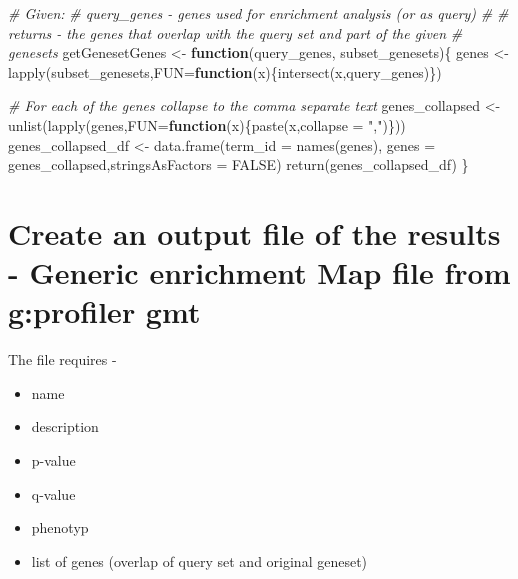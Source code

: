 \documentclass[
]{book}
\newenvironment{Shaded}{\begin{snugshade}}{\end{snugshade}}
\newcommand{\AttributeTok}[1]{\textcolor[rgb]{0.77,0.63,0.00}{#1}}
\newcommand{\CommentTok}[1]{\textcolor[rgb]{0.56,0.35,0.01}{\textit{#1}}}
\newcommand{\ConstantTok}[1]{\textcolor[rgb]{0.00,0.00,0.00}{#1}}
\newcommand{\ControlFlowTok}[1]{\textcolor[rgb]{0.13,0.29,0.53}{\textbf{#1}}}
\newcommand{\FunctionTok}[1]{\textcolor[rgb]{0.00,0.00,0.00}{#1}}
\newcommand{\NormalTok}[1]{#1}
\newcommand{\OtherTok}[1]{\textcolor[rgb]{0.56,0.35,0.01}{#1}}
\newcommand{\StringTok}[1]{\textcolor[rgb]{0.31,0.60,0.02}{#1}}
\providecommand{\tightlist}{%
  \setlength{\itemsep}{0pt}\setlength{\parskip}{0pt}}
\begin{document}
\begin{Shaded}
\begin{Highlighting}[]
\CommentTok{\# Given:}
\CommentTok{\# query\_genes {-} genes used for enrichment analysis (or as query)}
\CommentTok{\#}
\CommentTok{\# returns {-} the genes that overlap with the query set and part of the given}
\CommentTok{\#           genesets}
\NormalTok{getGenesetGenes }\OtherTok{\textless{}{-}} \ControlFlowTok{function}\NormalTok{(query\_genes, subset\_genesets)\{}
\NormalTok{  genes }\OtherTok{\textless{}{-}} \FunctionTok{lapply}\NormalTok{(subset\_genesets,}\AttributeTok{FUN=}\ControlFlowTok{function}\NormalTok{(x)\{}\FunctionTok{intersect}\NormalTok{(x,query\_genes)\})}
  
  \CommentTok{\# For each of the genes collapse to the comma separate text}
\NormalTok{  genes\_collapsed }\OtherTok{\textless{}{-}} \FunctionTok{unlist}\NormalTok{(}\FunctionTok{lapply}\NormalTok{(genes,}\AttributeTok{FUN=}\ControlFlowTok{function}\NormalTok{(x)\{}\FunctionTok{paste}\NormalTok{(x,}\AttributeTok{collapse =} \StringTok{","}\NormalTok{)\}))}
\NormalTok{  genes\_collapsed\_df }\OtherTok{\textless{}{-}} \FunctionTok{data.frame}\NormalTok{(}\AttributeTok{term\_id =} \FunctionTok{names}\NormalTok{(genes), }\AttributeTok{genes =}\NormalTok{ genes\_collapsed,}\AttributeTok{stringsAsFactors =} \ConstantTok{FALSE}\NormalTok{)}
  \FunctionTok{return}\NormalTok{(genes\_collapsed\_df)}
\NormalTok{\}}
\end{Highlighting}
\end{Shaded}

\hypertarget{create-an-output-file-of-the-results---generic-enrichment-map-file-from-gprofiler-gmt}{%
\section{Create an output file of the results - Generic enrichment Map file from g:profiler gmt}\label{create-an-output-file-of-the-results---generic-enrichment-map-file-from-gprofiler-gmt}}

The file requires -

\begin{itemize}
\tightlist
\item
  name
\item
  description
\item
  p-value
\item
  q-value
\item
  phenotyp
\item
  list of genes (overlap of query set and original geneset)
\end{itemize}
\end{document}
